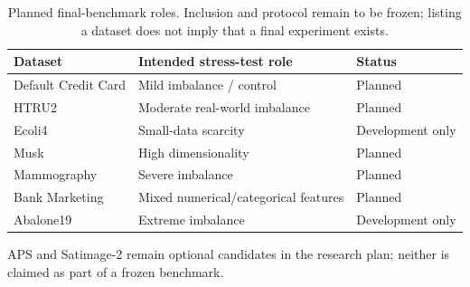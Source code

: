 \begin{table}[t]
  \centering
  \caption{Planned final-benchmark roles. Inclusion and protocol remain to be
  frozen; listing a dataset does not imply that a final experiment exists.}
  \label{tab:planned-benchmark}
  \small
  \begin{tabularx}{\linewidth}{@{}lXl@{}}
    \toprule
    Dataset & Intended stress-test role & Status \\
    \midrule
    Default Credit Card & Mild imbalance / control & Planned \\
    HTRU2 & Moderate real-world imbalance & Planned \\
    Ecoli4 & Small-data scarcity & Development only \\
    Musk & High dimensionality & Planned \\
    Mammography & Severe imbalance & Planned \\
    Bank Marketing & Mixed numerical/categorical features & Planned \\
    Abalone19 & Extreme imbalance & Development only \\
    \bottomrule
  \end{tabularx}
  \par\smallskip
  \footnotesize APS and Satimage-2 remain optional candidates in the research
  plan; neither is claimed as part of a frozen benchmark.
\end{table}

